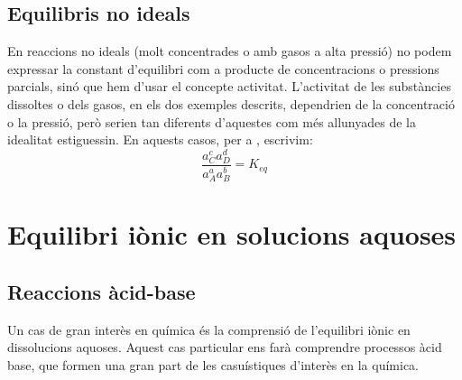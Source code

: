 \subsection{Equilibris no ideals}

En reaccions no ideals (molt concentrades o amb gasos a alta pressió) no podem expressar la constant d'equilibri com a producte de concentracions o pressions parcials, sinó que hem d'usar el concepte activitat. L'activitat de les substàncies dissoltes o dels gasos, en els dos exemples descrits, dependrien de la concentració o la pressió, però serien tan diferents d'aquestes com més allunyades de la idealitat estiguessin. En aquests casos, per a , escrivim:
\[
\frac{a_C^c a_D^d}{a_A^a a_B^b}=K_{eq}
\]

%
%
\section{Equilibri iònic en solucions aquoses}

\subsection{Reaccions àcid-base}

Un cas de gran interès en química és la comprensió de l'equilibri iònic en dissolucions aquoses. 
Aquest cas particular ens farà comprendre processos àcid base, que formen una gran part de les casuístiques d'interès en la química.

